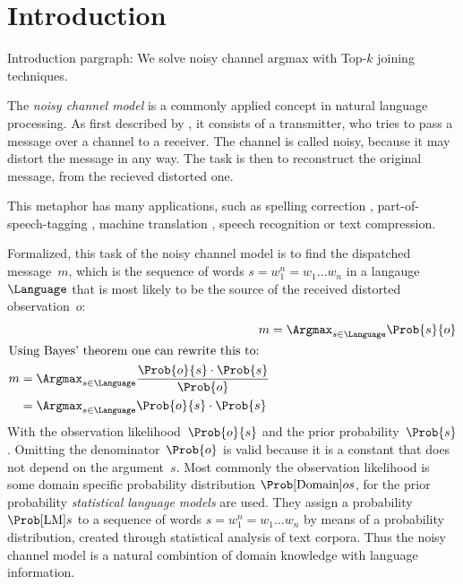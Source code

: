 \chapter{Introduction}

\begin{draft}
Introduction pargraph: We solve noisy channel argmax with Top-$k$ joining
techniques.
\end{draft}

The \emph{noisy channel model} is a commonly applied concept in natural language
processing.
As first described by \cite{Shannon1948}, it consists of a transmitter, who
tries to pass a message over a channel to a receiver.
The channel is called noisy, because it may distort the message in any way.
The task is then to reconstruct the original message, from the recieved
distorted one.

This metaphor has many applications, such as spelling correction
\parencite{JurafskyMartin2009,Manning2008,Kernighan1990,Mays1991},
part-of-speech-tagging \parencite{Church1988}, machine translation
\parencite{Brown1990}, speech recognition or text compression.

Formalized, this task of the noisy channel model is to find the dispatched
message~$m$, which is the sequence of words $s = w_1^n = w_1 \ldots w_n$ in a
langauge~$\Language$ that is most likely to be the source of the received
distorted observation~$o$:
\begin{align}
  \label{eq:noisychannel}
  m &= \Argmax_{s \in \Language} \Prob{s}{o} \\
  \intertext{Using Bayes' theorem one can rewrite this to:}
  \label{eq:noisychannelbayes}
  \begin{split}
    m &= \Argmax_{s \in \Language} \frac{\Prob{o}{s} \cdot \Prob{s}}{\Prob{o}} \\
      &= \Argmax_{s \in \Language} \Prob{o}{s} \cdot \Prob{s}
  \end{split}
\end{align}
With the observation likelihood~$\Prob{o}{s}$ and the prior
probability~$\Prob{s}$.
Omitting the denominator~$\Prob{o}$ is valid because it is a constant that does
not depend on the argument~$s$.
Most commonly the observation likelihood is some domain specific probability
distribution $\Prob[\text{Domain}]{o}{s}$, for the prior probability
\emph{statistical language models} are used.
They assign a probability $\Prob[\text{LM}]{s}$ to a sequence of words
$s = w_1^n = w_1 \ldots w_n$ by means of a probability distribution, created
through statistical analysis of text corpora.
Thus the noisy channel model is a natural combintion of domain knowledge with
language information.


